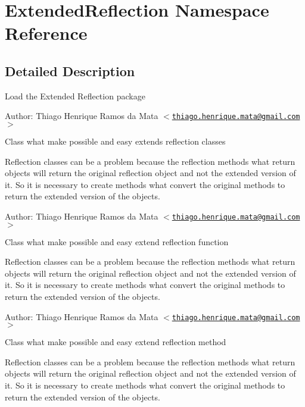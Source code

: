 \hypertarget{namespace_extended_reflection}{
\section{ExtendedReflection Namespace Reference}
\label{namespace_extended_reflection}
}


\subsection{Detailed Description}
Load the Extended Reflection package \begin{Desc}
\item[Author:]Thiago Henrique Ramos da Mata $<$\href{mailto:thiago.henrique.mata@gmail.com}{\tt thiago.henrique.mata@gmail.com}$>$\end{Desc}
Class what make possible and easy extends reflection classes

Reflection classes can be a problem because the reflection methods what return objects will return the original reflection object and not the extended version of it. So it is necessary to create methods what convert the original methods to return the extended version of the objects.

\begin{Desc}
\item[Author:]Thiago Henrique Ramos da Mata $<$\href{mailto:thiago.henrique.mata@gmail.com}{\tt thiago.henrique.mata@gmail.com}$>$\end{Desc}
Class what make possible and easy extend reflection function

Reflection classes can be a problem because the reflection methods what return objects will return the original reflection object and not the extended version of it. So it is necessary to create methods what convert the original methods to return the extended version of the objects.

\begin{Desc}
\item[Author:]Thiago Henrique Ramos da Mata $<$\href{mailto:thiago.henrique.mata@gmail.com}{\tt thiago.henrique.mata@gmail.com}$>$\end{Desc}
Class what make possible and easy extend reflection method

Reflection classes can be a problem because the reflection methods what return objects will return the original reflection object and not the extended version of it. So it is necessary to create methods what convert the original methods to return the extended version of the objects.

